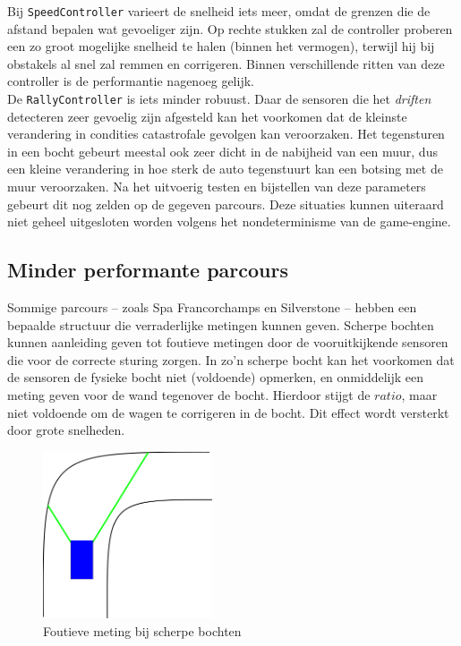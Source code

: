 \documentclass[10pt,a4paper]{article}
\begin{document}
			Bij \texttt{SpeedController} varieert de snelheid iets meer, omdat de grenzen die de afstand bepalen wat gevoeliger zijn. Op rechte stukken zal de controller proberen een zo groot mogelijke snelheid te halen (binnen het vermogen), terwijl hij bij obstakels al snel zal remmen en corrigeren. Binnen verschillende ritten van deze controller is de performantie nagenoeg gelijk.\\

			De \texttt{RallyController} is iets minder robuust. Daar de sensoren die het \textit{driften} detecteren zeer gevoelig zijn afgesteld kan het voorkomen dat de kleinste verandering in condities catastrofale gevolgen kan veroorzaken. Het tegensturen in een bocht gebeurt meestal ook zeer dicht in de nabijheid van een muur, dus een kleine verandering in hoe sterk de auto tegenstuurt kan een botsing met de muur veroorzaken. Na het uitvoerig testen en bijstellen van deze parameters gebeurt dit nog zelden op de gegeven parcours. Deze situaties kunnen uiteraard niet geheel uitgesloten worden volgens het nondeterminisme van de game-engine.\\

		\subsection{Minder performante parcours}
			Sommige parcours -- zoals Spa Francorchamps en Silverstone -- hebben een bepaalde structuur die verraderlijke metingen kunnen geven. Scherpe bochten kunnen aanleiding geven tot foutieve metingen door de vooruitkijkende sensoren die voor de correcte sturing zorgen. In zo'n scherpe bocht kan het voorkomen dat de sensoren de fysieke bocht niet (voldoende) opmerken, en onmiddelijk een meting geven voor de wand tegenover de bocht. Hierdoor stijgt de $ratio$, maar niet voldoende om de wagen te corrigeren in de bocht. Dit effect wordt versterkt door grote snelheden.

			\begin{figure}[h]
				\centering
				\includegraphics[width=5cm]{sensors-corner.png}
				\caption{Foutieve meting bij scherpe bochten}
				\label{fig:sensors-corner}
			\end{figure}
\end{document}
